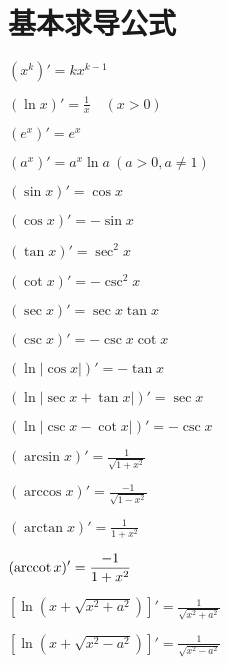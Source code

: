 \section{基本求导公式}

\begin{multicols}{2}
    \begin{spacing}{\hangju}
        \noindent $\displaystyle (x^k)' = kx^{k-1}$

        \noindent $\displaystyle (\ln x)' = \frac{1}{x} \quad (x > 0)$

        \noindent $\displaystyle (e^x)' = e^x$

        \noindent $\displaystyle (a^x)' = a^x\ln{a} \  (a > 0, a \neq 1)$

        \noindent $\displaystyle (\sin{x})' = \cos{x}$

        \noindent $\displaystyle (\cos{x})' = -\sin{x}$

        \noindent $\displaystyle (\tan{x})' = \sec^2{x}$

        \noindent $\displaystyle (\cot{x})' = -\csc^2{x}$

        \noindent $\displaystyle (\sec{x})' = \sec{x}\tan{x}$

        \noindent $\displaystyle (\csc{x})' = -\csc{x}\cot{x}$

        \noindent $\displaystyle (\ln{\left| \cos{x} \right|})' = -\tan{x}$

        \noindent $\displaystyle (\ln{\left| \sec{x} + \tan{x} \right|})' = \sec{x}$

        \noindent $\displaystyle (\ln{\left| \csc{x} - \cot{x} \right|})' = -\csc{x}$

        \noindent $\displaystyle (\arcsin{x})' = \frac{1}{\sqrt{1 + x^2}}$

        \noindent $\displaystyle (\arccos{x})' = \frac{-1}{\sqrt{1 - x^2}}$

        \noindent $\displaystyle (\arctan{x})' = \frac{1}{1 + x^2}$

        \noindent $\displaystyle ( \operatorname{arccot}{x})' = \frac{-1}{1 + x^2}$

        \noindent $\displaystyle [\ln{(x + \sqrt{x^2 + a^2})}]' = \frac{1}{\sqrt{x^2 + a^2}}$

        \noindent $\displaystyle [\ln{(x + \sqrt{x^2 - a^2})}]' = \frac{1}{\sqrt{x^2 - a^2}}$
    \end{spacing}
\end{multicols}

